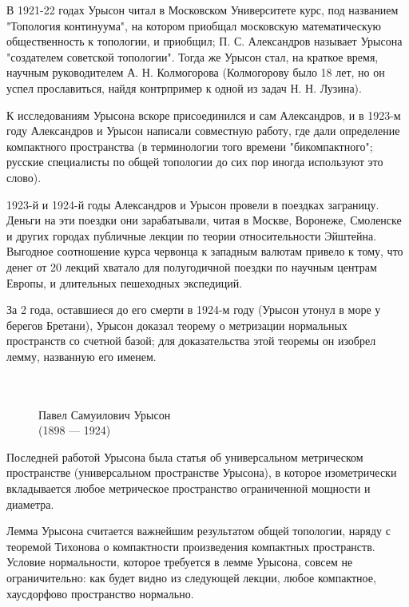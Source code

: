 \documentclass[12pt]{book}
\theoremstyle{upshape}
\theoremstyle{generic}
\theoremstyle{upshapenonumber}
\newcommand{\следствие}{%
     \refstepcounter{teorema}
     {\noindent\bf Следствие \thechapter.\arabic{teorema}:\ }}
\newcommand{\пример}{%
     \refstepcounter{teorema}
     {\noindent\bf Пример \thechapter.\arabic{teorema}:\ }}
\newcommand{\лемма}{%
     \refstepcounter{teorema}
     {\noindent\bf Лемма \thechapter.\arabic{teorema}:\ }}
\newcommand{\теорема}{%
     \refstepcounter{teorema}
     {\noindent\bf Теорема \thechapter.\arabic{teorema}:\ }}
\newcommand{\утверждение}{%
     \refstepcounter{teorema}
     {\noindent\bf Утверждение \thechapter.\arabic{teorema}:\ }}
\begin{document}
В 1921-22 годах Урысон читал в Московском Университете
курс, под названием "Топология континуума", на котором 
приобщал московскую математическую общественность
к топологии, и приобщил; П. С. Александров
называет Урысона "создателем советской топологии".
Тогда же Урысон стал, на краткое время, научным 
руководителем А. Н. Колмогорова (Колмогорову было 
18 лет, но он успел прославиться, найдя контрпример
к одной из задач Н. Н. Лузина). 

К исследованиям Урысона 
вскоре присоединился и сам Александров,
и в 1923-м году Александров и Урысон написали
совместную работу, где дали определение компактного
пространства (в терминологии того времени "бикомпактного";
русские специалисты по общей топологии до сих пор
иногда используют это слово).

1923-й и 1924-й годы Александров и Урысон 
провели в поездках заграницу. Деньги на эти
поездки они зарабатывали, читая в Москве,
Воронеже, Смоленске и других городах публичные
лекции по теории относительности Эйштейна.
Выгодное соотношение курса червонца к 
западным валютам привело к тому, что денег
от 20 лекций хватало для полугодичной поездки
по научным центрам Европы, и длительных
пешеходных экспедиций.

За 2 года, оставшиеся до его смерти в 1924-м году
(Урысон утонул в море у берегов Бретани), Урысон
доказал теорему о метризации нормальных
пространств со счетной базой; для доказательства
этой теоремы он изобрел лемму, названную его именем.

\begin{figure}[ht]
\begin{center}\ \\
\\
{Павел Самуилович Урысон\\
(1898 --- 1924)}
\end{center}
\end{figure}


Последней работой Урысона была
статья об универсальном метрическом пространстве
(универсальном пространстве Урысона), в которое 
изометрически вкладывается любое
метрическое пространство ограниченной
мощности и диаметра. 

Лемма Урысона считается важнейшим результатом
общей топологии, наряду с теоремой
Тихонова о компактности произведения
компактных пространств.
Условие нормальности, которое требуется
в лемме Урысона, совсем не ограничительно:
как будет видно из следующей лекции,
любое компактное, хаусдорфово пространство
нормально. 
\end{document}
